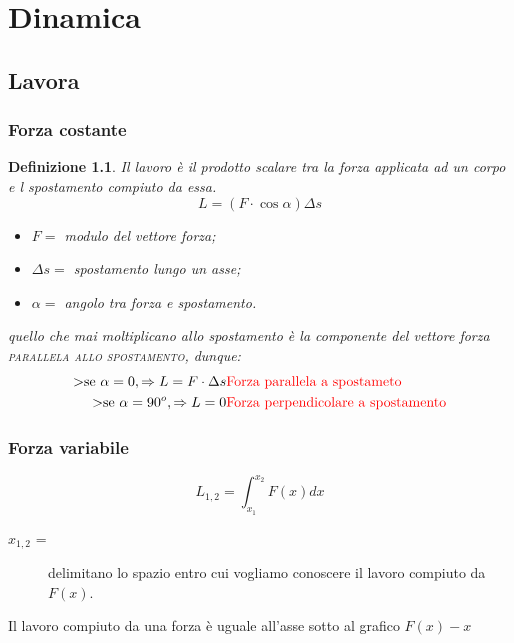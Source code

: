 \documentclass{book}
\newtheorem{defi}{Definizione}[section]
\begin{document}
\chapter{Dinamica}
\label{chap:Dinamica}

\section{Lavora}
\label{sec:lavoro}

\subsection{Forza costante}
\label{sec:forcostlav}

\begin{defi}
  Il lavoro è il prodotto scalare tra la forza applicata ad un corpo e l spostamento compiuto da essa.
  \begin{equation}
    \label{eq:lavoro}
    L=(F\cdot \cos \alpha) \Delta s
  \end{equation}
  \begin{itemize}
  \item $F=$ modulo del vettore forza;
  \item $\Delta s=$ spostamento lungo un asse;
  \item $\alpha=$ angolo tra forza e spostamento.
  \end{itemize}
  quello che mai moltiplicano allo spostamento è {\color{red}la componente del vettore forza \textsc{parallela allo spostamento}}, dunque:
  \begin{eqnarray*}
    \text{>se } \alpha = 0, \Rightarrow L = F\cdot \Delta s & \text{\color{red}Forza parallela a spostameto}\\
    \text{>se } \alpha = 90^o, \Rightarrow L = 0 & \text{\color{red}Forza perpendicolare a spostamento} 
  \end{eqnarray*}
\end{defi}

\subsection{Forza variabile}
\label{sec:forzavarlav}
\begin{equation}
  \label{eq:forzavarlav}
  L_{1,2}=\int_{x_1}^{x_2}F(x)dx
\end{equation}
\begin{description}
\item[$x_{1,2}$ =] delimitano lo spazio entro cui vogliamo conoscere il lavoro compiuto da $F(x)$. 
\end{description}
Il lavoro compiuto da una forza è uguale all'asse sotto al grafico $F(x)-x$
\end{document}
